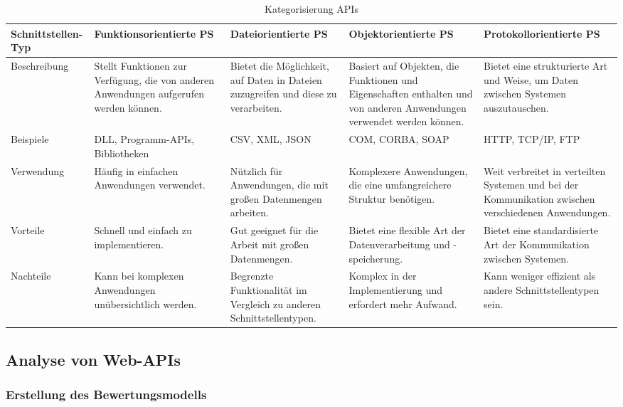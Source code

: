 \documentclass[notitlepage, hidelinks]{article}
\begin{document}
\begin{table}[H]
\begin{center}
\begin{tabular}{|L{2cm}|L{2.8cm}|L{2.8cm}|L{2.8cm}|L{2.8cm}|}
\hline
Schnittstellen-Typ & Funktionsorientierte PS & Dateiorientierte PS & Objektorientierte PS & Protokollorientierte PS \\
\hline
Beschreibung & Stellt Funktionen zur Verfügung, die von anderen Anwendungen aufgerufen werden können. & Bietet die Möglichkeit, auf Daten in Dateien zuzugreifen und diese zu verarbeiten. & Basiert auf Objekten, die Funktionen und Eigenschaften enthalten und von anderen Anwendungen verwendet werden können. & Bietet eine strukturierte Art und Weise, um Daten zwischen Systemen auszutauschen. \\
\hline
Beispiele & DLL, Programm-APIs, Bibliotheken & CSV, XML, JSON & COM, CORBA, SOAP & HTTP, TCP/IP, FTP \\
\hline
Verwendung & Häufig in einfachen Anwendungen verwendet. & Nützlich für Anwendungen, die mit großen Datenmengen arbeiten. & Komplexere Anwendungen, die eine umfangreichere Struktur benötigen. & Weit verbreitet in verteilten Systemen und bei der Kommunikation zwischen verschiedenen Anwendungen. \\
\hline
Vorteile & Schnell und einfach zu implementieren. & Gut geeignet für die Arbeit mit großen Datenmengen. & Bietet eine flexible Art der Datenverarbeitung und -speicherung. & Bietet eine standardisierte Art der Kommunikation zwischen Systemen. \\
\hline
Nachteile & Kann bei komplexen Anwendungen unübersichtlich werden. & Begrenzte Funktionalität im Vergleich zu anderen Schnittstellentypen. & Komplex in der Implementierung und erfordert mehr Aufwand. & Kann weniger effizient als andere Schnittstellentypen sein. \\
\hline
\end{tabular}
\caption{Kategorisierung APIs}
\label{apiscategories}
\end{center}
\end{table}


\subsection{Analyse von Web-APIs}

\subsubsection{Erstellung des Bewertungsmodells}
\end{document}
